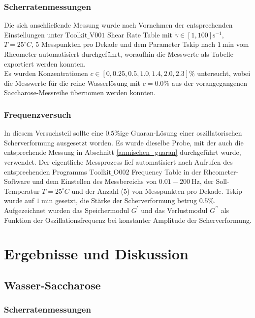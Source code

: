 \documentclass[11pt,a4paper,oneside]{scrartcl}
\begin{document}
\subsubsection{Scherratenmessungen}
Die sich anschließende Messung wurde nach Vornehmen der entsprechenden Einstellungen unter $\mathrm{Toolkit\_V001}$ Shear Rate Table mit $\dot\gamma\in[1,100]\mathrm s^{-1}$, $T=25^\circ C$, 5 Messpunkten pro Dekade und dem Parameter Tskip nach $1\ \mathrm{min}$ vom Rheometer automatisiert durchgeführt, woraufhin die Messwerte als Tabelle exportiert werden konnten.\\
Es wurden Konzentrationen $c\in[0,0.25,0.5,1.0,1.4,2.0,2.3]\%$ untersucht, wobei die Messwerte für die reine Wasserlösung mit $c=0.0\%$ aus der vorangegangenen Saccharose-Messreihe übernomen werden konnten.
\subsubsection{Frequenzversuch}
In diesem Versuchsteil sollte eine $0.5\%$ige Guaran-Lösung einer oszillatorischen Scherverformung ausgesetzt worden. Es wurde dieselbe Probe, mit der auch die entsprechende Messung in Abschnitt \ref{anmischen_guaran} durchgeführt wurde, verwendet. Der eigentliche Messprozess lief automatisiert nach Aufrufen des entsprechenden Programms $\mathrm{Toolkit\_O002}$ Frequency Table in der Rheometer-Software und dem Einstellen des Messbereichs von $0.01-200\ \mathrm{Hz}$, der Soll-Temperatur $T=25^\circ C$ und der Anzahl (5) von Messpunkten pro Dekade. Tskip wurde auf $1\ \mathrm{min}$ gesetzt, die Stärke der Scherverformung betrug $0.5\%$.\\
Aufgezeichnet wurden das Speichermodul $G^\prime$ und das Verlustmodul $G^{\prime\prime}$ als Funktion der Oszillationsfrequenz bei konstanter Amplitude der Scherverformung.
\section{Ergebnisse und Diskussion}
\subsection{Wasser-Saccharose}
\subsubsection{Scherratenmessungen}

\end{document}

